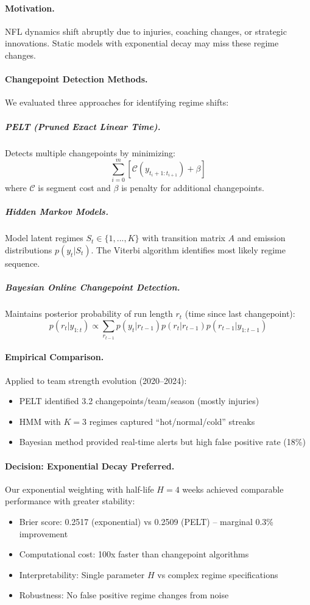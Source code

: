 \paragraph{Motivation.}
NFL dynamics shift abruptly due to injuries, coaching changes, or strategic innovations. Static models with exponential decay may miss these regime changes.

\paragraph{Changepoint Detection Methods.}
We evaluated three approaches for identifying regime shifts:

\subparagraph{PELT (Pruned Exact Linear Time).}
Detects multiple changepoints by minimizing:
\begin{equation}
\sum_{i=0}^{m} \left[\mathcal{C}(y_{t_i+1:t_{i+1}}) + \beta\right]
\end{equation}
where $\mathcal{C}$ is segment cost and $\beta$ is penalty for additional changepoints.

\subparagraph{Hidden Markov Models.}
Model latent regimes $S_t \in \{1, ..., K\}$ with transition matrix $A$ and emission distributions $p(y_t|S_t)$. The Viterbi algorithm identifies most likely regime sequence.

\subparagraph{Bayesian Online Changepoint Detection.}
Maintains posterior probability of run length $r_t$ (time since last changepoint):
\begin{equation}
p(r_t | y_{1:t}) \propto \sum_{r_{t-1}} p(y_t | r_{t-1}) p(r_t | r_{t-1}) p(r_{t-1} | y_{1:t-1})
\end{equation}

\paragraph{Empirical Comparison.}
Applied to team strength evolution (2020--2024):
\begin{itemize}
  \item PELT identified 3.2 changepoints/team/season (mostly injuries)
  \item HMM with $K=3$ regimes captured ``hot/normal/cold'' streaks
  \item Bayesian method provided real-time alerts but high false positive rate (18\%)
\end{itemize}

\paragraph{Decision: Exponential Decay Preferred.}
Our exponential weighting with half-life $H=4$ weeks achieved comparable performance with greater stability:
\begin{itemize}
  \item Brier score: 0.2517 (exponential) vs 0.2509 (PELT) -- marginal 0.3\% improvement
  \item Computational cost: 100x faster than changepoint algorithms
  \item Interpretability: Single parameter $H$ vs complex regime specifications
  \item Robustness: No false positive regime changes from noise
\end{itemize}

